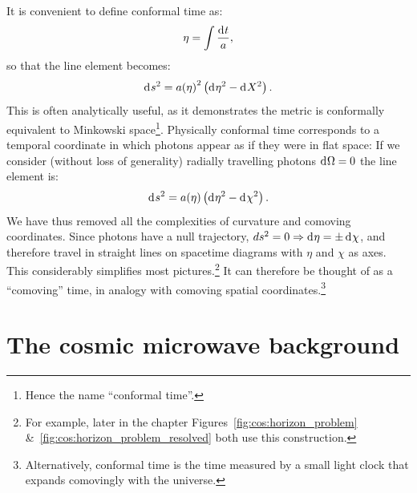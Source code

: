 It is convenient to define conformal time as:
\begin{equation}
  \eta = \int \frac{\operatorname{d}^{}\!{t}}{a},
  \label{eqn:cos:conformal_time}
\end{equation}
so that the line element becomes:
\begin{equation}          
  \operatorname{d}^{}\!{s}^2 = {a(\eta)}^2\left( \operatorname{d}^{}\!{\eta}^2 - \operatorname{d}^{}\!{X}^2 \right).
  \label{eqn:cos:flat_FRW}
\end{equation}
This is often analytically useful, as it demonstrates the metric is conformally equivalent to Minkowski space\footnote{Hence the name ``conformal time''.}. Physically conformal time corresponds to a temporal coordinate in which photons appear as if they were in flat space: If we consider (without loss of generality) radially travelling photons \(\operatorname{d}^{}\!{\Omega}=0\) the line element is:
\begin{equation}          
  \operatorname{d}^{}\!{s}^2 = a(\eta)\left( \operatorname{d}^{}\!{\eta}^2 - \operatorname{d}^{}\!{\chi}^2 \right).
  \label{eqn:cos:flat_FRW_radial}
\end{equation}
We have thus removed all the complexities of curvature and comoving coordinates. Since photons have a null trajectory, \(ds^2=0\Rightarrow \operatorname{d}^{}\!{\eta} = \pm \operatorname{d}^{}\!{\chi}\), and therefore  travel in straight lines on spacetime diagrams with \(\eta\) and \(\chi\) as axes. This considerably simplifies most pictures.\footnote{For example, later in the chapter Figures~\protect\ref{fig:cos:horizon_problem} \&~\protect\ref{fig:cos:horizon_problem_resolved} both use this construction.}  It can therefore be thought of as a ``comoving'' time, in analogy with comoving spatial coordinates.\footnote{Alternatively, conformal time is the time measured by a small light clock that expands comovingly with the universe.}

\section{The cosmic microwave background}

